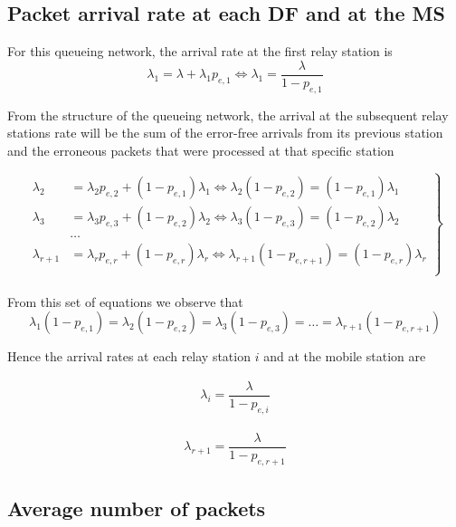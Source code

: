 \subsection{Packet arrival rate at each DF and at the MS}

For this queueing network, the arrival rate at the first relay station is
$$\lambda_1 = \lambda + \lambda_1 p_{e,1} \Leftrightarrow \lambda_1 = \dfrac{\lambda}{1 - p_{e,1}}$$

From the structure of the queueing network, the arrival at the subsequent relay
stations rate will be the sum of the error-free arrivals from its previous
station and the erroneous packets that were processed at that specific station

\begin{equation}
 \left.
  \begin{array}{rl}
    \lambda_2 &= \lambda_2 p_{e,2} + (1 - p_{e,1}) \lambda_1 \Leftrightarrow
    \lambda_2 (1 - p_{e,2}) = (1 - p_{e,1}) \lambda_1 \\
    \lambda_3 &= \lambda_3 p_{e,3} + (1 - p_{e,2}) \lambda_2 \Leftrightarrow
    \lambda_3 (1 - p_{e,3}) = (1 - p_{e,2}) \lambda_2 \\
    & \dots \\
    \lambda_{r+1} &= \lambda_r p_{e,r} + (1 - p_{e,r}) \lambda_r \Leftrightarrow
    \lambda_{r+1} (1 - p_{e,r+1}) = (1 - p_{e,r}) \lambda_r \\
  \end{array}
\right\} \label{eq:03_1}
\end{equation} \\

From this set of equations we observe that
$$\lambda_1 (1-p_{e,1}) = \lambda_2 (1-p_{e,2}) = \lambda_3 (1-p_{e,3})
= \dots = \lambda_{r+1} (1 - p_{e,r+1})$$

Hence the arrival rates at each relay station $i$ and at the mobile station are

\begin{align}
  \lambda_i = \dfrac{\lambda}{1-p_{e,i}}
  \label{eq:03_lambda_i}
\end{align}

\begin{align}
  \lambda_{r+1} = \dfrac{\lambda}{1-p_{e,r+1}}
  \label{eq:03_lambda_r_plus_one}
\end{align}


\subsection{Average number of packets}

